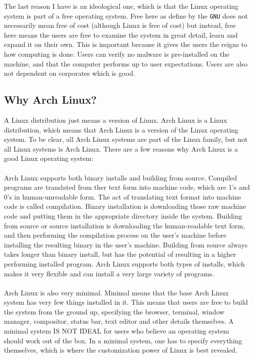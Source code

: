 \documentclass[a4paper, 12pt]{report}
\begin{document}
\begin{center}
The last reason I have is an ideological one, which is that the Linux operating system is part of a free operating system. Free here as define by the \texttt{GNU} does not necessarily mean free of cost (although Linux is free of cost) but instead, free here means the users are free to examine the system in great detail, learn and expand it on their own. This is important because it gives the users the reigns to how computing is done. Users can verify no malware is pre-installed on the machine, and that the computer performs up to user expectations. Users are also not dependent on corporates which is good.

\subsection{Why Arch Linux?}

A Linux distribution just means a version of Linux. Arch Linux is a Linux distribution, which means that Arch Linux is a version of the Linux operating system. To be clear, all Arch Linux systems are part of the Linux family, but not all Linux systems is Arch Linux. There are a few reasons why Arch Linux is a good Linux operating system:
\\~\\Arch Linux supports both binary installs and building from source. Compiled programs are translated from ther text form into machine code, which are 1's and 0's in human-unreadable form. The act of translating text format into machine code is called compilation. Binary installation is downloading those raw machine code and putting them in the appropriate directory inside the system. Building from source or source installation is downloading the human-readable text form, and then performing the compilation process on the user's machine before installing the resulting binary in the user's machine. Building from source always takes longer than binary install, but has the potential of resulting in a higher performing installed program.  Arch Linux supports both types of installs, which makes it very flexible and can install a very large variety of programs.
\\~\\Arch Linux is also very minimal. Minimal means that the base Arch Linux system has very few things installed in it. This means that users are free to build the system from the ground up, specifying the browser, terminal, window manager, compositor, status bar, text editor and other details themselves. A minimal system IS NOT IDEAL for users who believe an operating system should work out of the box. In a minimal system, one has to specify everything themselves, which is where the customization power of Linux is best revealed. 

\end{center}
\end{document}
